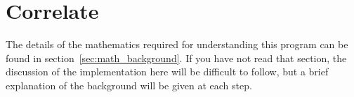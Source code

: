 \documentclass{article}
\newcommand{\angles}[1]{\ensuremath{\left\langle #1 \right\rangle}}
\newcommand{\gn}[1]{\ensuremath{g^{(#1)}}}
\begin{document}
\section{Correlate}
\label{sec:correlate}
The details of the mathematics required for understanding this program can be found in section~\ref{sec:math_background}. If you have not read that section, the discussion of the implementation here will be difficult to follow, but a brief explanation of the background will be given at each step.
\end{document}
